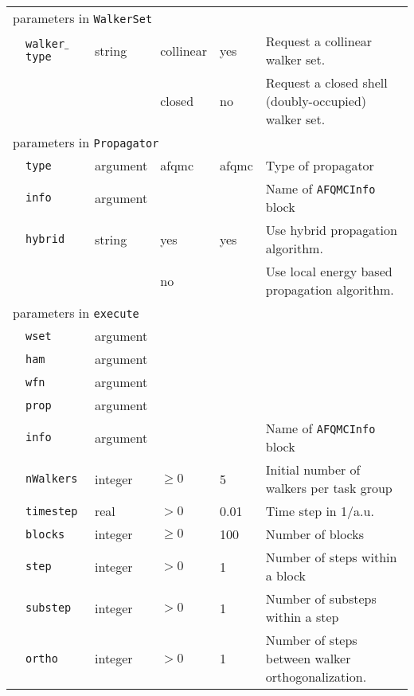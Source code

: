 \begin{table}[h]
\begin{center}
\begin{tabularx}{\textwidth}{l l l l l X }
\multicolumn{6}{l}{parameters in \texttt{WalkerSet}} \\
   &   \texttt{walker$\_$type       } &  string    & collinear  & yes  & Request a collinear walker set. \\ 
   &   \texttt{       } &     & closed  & no  & Request a closed shell (doubly-occupied) walker set. \\ 
\multicolumn{6}{l}{parameters in \texttt{Propagator}} \\
   &   \texttt{type            } &  argument   & afqmc & afqmc & Type of propagator \\
   &   \texttt{info            } &  argument   &       &       & Name of \texttt{AFQMCInfo} block \\
   &   \texttt{hybrid   } &  string   & yes  & yes  & Use hybrid propagation algorithm. \\ 
   &   \texttt{   } &     & no  &  & Use local energy based propagation algorithm. \\ 
\multicolumn{6}{l}{parameters in \texttt{execute}} \\
   &   \texttt{wset            } &  argument    &         &      &  \\
   &   \texttt{ham             } & argument     &         &      &  \\
   &   \texttt{wfn             } & argument     &         &      &  \\
   &   \texttt{prop            } & argument     &         &      &  \\
   &   \texttt{info            } &  argument    &         &      & Name of \texttt{AFQMCInfo} block \\
   &   \texttt{nWalkers        } &  integer     & $\ge 0$ & 5    & Initial number of walkers per task group   \\
   &   \texttt{timestep        } &  real        & $> 0$   & 0.01 & Time step in 1/a.u. \\
   &   \texttt{blocks          } &  integer     & $\ge 0$ & 100  & Number of blocks            \\
   &   \texttt{step            } &  integer     & $> 0$   & 1    & Number of steps within a block \\
   &   \texttt{substep         } &  integer     & $> 0$   & 1    & Number of substeps within a step \\
   &   \texttt{ortho           } &  integer     & $> 0$   & 1    & Number of steps between walker orthogonalization. \\ 
  \hline
\end{tabularx}
\end{center}
\end{table}

